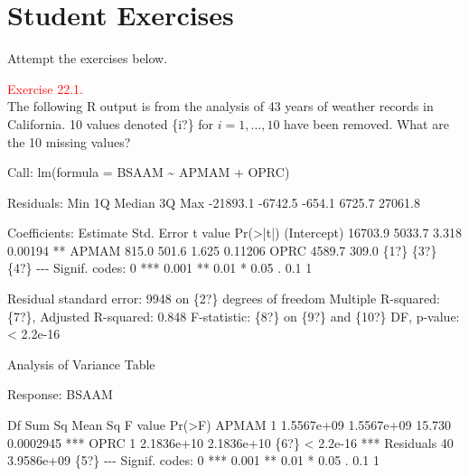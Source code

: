 \documentclass[
]{book}
\newenvironment{Shaded}{\begin{snugshade}}{\end{snugshade}}
\newcommand{\NormalTok}[1]{#1}
\begin{document}
\hypertarget{Sec_Linear_ANOVA:exer}{%
\section*{\texorpdfstring{{\textbf{Student Exercises}}}{Student Exercises}}\label{Sec_Linear_ANOVA:exer}}

Attempt the exercises below.

\leavevmode{}%
\textcolor{red}{Exercise 22.1.}\\
The following R output is from the analysis of 43 years of weather records in California. 10 values denoted \{i?\} for \(i=1,\dots,10\) have been removed. What are the 10 missing values?

\begin{Shaded}
\begin{Highlighting}[]
\NormalTok{Call:}
\NormalTok{lm(formula = BSAAM \textasciitilde{} APMAM + OPRC)}

\NormalTok{Residuals:}
\NormalTok{     Min       1Q   Median       3Q      Max}
\NormalTok{{-}21893.1  {-}6742.5   {-}654.1   6725.7  27061.8}

\NormalTok{Coefficients:}
\NormalTok{            Estimate Std. Error t value Pr(\textgreater{}|t|)}
\NormalTok{(Intercept)  16703.9     5033.7   3.318  0.00194 **}
\NormalTok{APMAM          815.0      501.6   1.625  0.11206}
\NormalTok{OPRC          4589.7      309.0    \{1?\}     \{3?\} \{4?\}}
\NormalTok{{-}{-}{-}}
\NormalTok{Signif. codes:   0 *** 0.001 ** 0.01 * 0.05 . 0.1   1}

\NormalTok{Residual standard error: 9948 on \{2?\} degrees of freedom}
\NormalTok{Multiple R{-}squared: \{7?\},     Adjusted R{-}squared: 0.848}
\NormalTok{F{-}statistic: \{8?\} on \{9?\} and \{10?\} DF,  p{-}value: \textless{} 2.2e{-}16}

\NormalTok{Analysis of Variance Table}

\NormalTok{Response: BSAAM}

\NormalTok{          Df     Sum Sq    Mean Sq F value    Pr(\textgreater{}F)}
\NormalTok{APMAM      1 1.5567e+09 1.5567e+09  15.730 0.0002945 ***}
\NormalTok{OPRC       1 2.1836e+10 2.1836e+10    \{6?\} \textless{} 2.2e{-}16 ***}
\NormalTok{Residuals 40 3.9586e+09       \{5?\}}
\NormalTok{{-}{-}{-}}
\NormalTok{Signif. codes: 0   *** 0.001 ** 0.01 * 0.05 . 0.1 1}
\end{Highlighting}
\end{Shaded}
\end{document}
